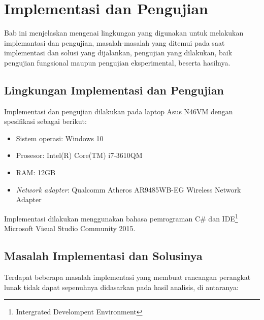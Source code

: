 \chapter{Implementasi dan Pengujian}
\label{chap:implementasi_pengujian}

Bab ini menjelaskan mengenai lingkungan yang digunakan untuk melakukan implemantasi dan pengujian, masalah-masalah yang ditemui pada saat implementasi dan solusi yang dijalankan, pengujian yang dilakukan, baik pengujian fungsional maupun pengujian eksperimental, beserta hasilnya.

\section{Lingkungan Implementasi dan Pengujian}
\label{sec:lingkungan_implementasi_dan_pengujian}

Implementasi dan pengujian dilakukan pada laptop Asus N46VM dengan spesifikasi sebagai berikut:

\begin{itemize}
    \item{Sistem operasi: Windows 10}
    \item{Prosesor: Intel(R) Core(TM) i7-3610QM}
    \item{RAM: 12GB}
    \item{\textit{Network adapter}: Qualcomm Atheros AR9485WB-EG Wireless Network Adapter}
\end{itemize}

Implementasi dilakukan menggunakan bahasa pemrograman C\# dan IDE\footnote{Intergrated Develompent Environment} Microsoft Visual Studio Community 2015.

\section{Masalah Implementasi dan Solusinya}
\label{sec:masalah_implementasi}

Terdapat beberapa masalah implementasi yang membuat rancangan perangkat lunak tidak dapat sepenuhnya didasarkan pada hasil analisis, di antaranya:


